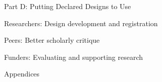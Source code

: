 \documentclass[11pt]{article}
\begin{document}
\begin{legal}
\item Part D: Putting Declared Designs to Use

	\begin{legal}
	\item  Researchers: Design development and registration
	\item  Peers: Better scholarly critique
	\item  Funders: Evaluating and supporting research 
	\end{legal}


\item Appendices
\end{legal}
\end{document}
